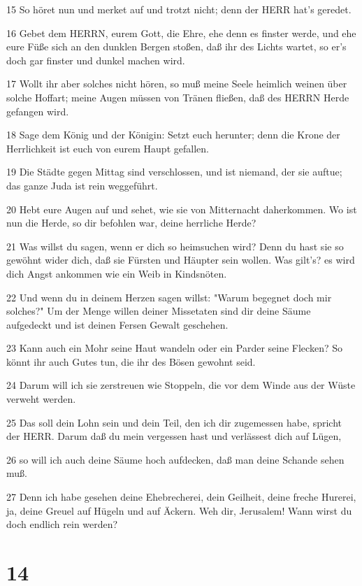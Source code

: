 \par 15 So höret nun und merket auf und trotzt nicht; denn der HERR hat's geredet.
\par 16 Gebet dem HERRN, eurem Gott, die Ehre, ehe denn es finster werde, und ehe eure Füße sich an den dunklen Bergen stoßen, daß ihr des Lichts wartet, so er's doch gar finster und dunkel machen wird.
\par 17 Wollt ihr aber solches nicht hören, so muß meine Seele heimlich weinen über solche Hoffart; meine Augen müssen von Tränen fließen, daß des HERRN Herde gefangen wird.
\par 18 Sage dem König und der Königin: Setzt euch herunter; denn die Krone der Herrlichkeit ist euch von eurem Haupt gefallen.
\par 19 Die Städte gegen Mittag sind verschlossen, und ist niemand, der sie auftue; das ganze Juda ist rein weggeführt.
\par 20 Hebt eure Augen auf und sehet, wie sie von Mitternacht daherkommen. Wo ist nun die Herde, so dir befohlen war, deine herrliche Herde?
\par 21 Was willst du sagen, wenn er dich so heimsuchen wird? Denn du hast sie so gewöhnt wider dich, daß sie Fürsten und Häupter sein wollen. Was gilt's? es wird dich Angst ankommen wie ein Weib in Kindsnöten.
\par 22 Und wenn du in deinem Herzen sagen willst: "Warum begegnet doch mir solches?" Um der Menge willen deiner Missetaten sind dir deine Säume aufgedeckt und ist deinen Fersen Gewalt geschehen.
\par 23 Kann auch ein Mohr seine Haut wandeln oder ein Parder seine Flecken? So könnt ihr auch Gutes tun, die ihr des Bösen gewohnt seid.
\par 24 Darum will ich sie zerstreuen wie Stoppeln, die vor dem Winde aus der Wüste verweht werden.
\par 25 Das soll dein Lohn sein und dein Teil, den ich dir zugemessen habe, spricht der HERR. Darum daß du mein vergessen hast und verlässest dich auf Lügen,
\par 26 so will ich auch deine Säume hoch aufdecken, daß man deine Schande sehen muß.
\par 27 Denn ich habe gesehen deine Ehebrecherei, dein Geilheit, deine freche Hurerei, ja, deine Greuel auf Hügeln und auf Äckern. Weh dir, Jerusalem! Wann wirst du doch endlich rein werden?

\chapter{14}

